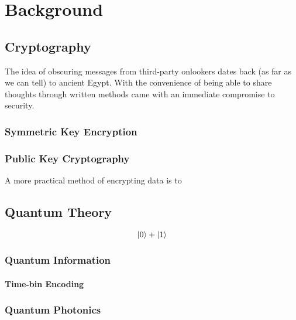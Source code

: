 %
%
\glsresetall
\graphicspath{{./chapters/chapter02/fig02/}}

\let\textcircled=\pgftextcircled
\chapter{Background}
\label{chap:background}

\section{Cryptography}
\label{sec1:crypto}

The idea of obscuring messages from third-party onlookers dates back (as far as we can tell) to ancient Egypt. With the convenience of being able to share thoughts through written methods came with an immediate compromise to security.

\subsection{Symmetric Key Encryption}

\subsection{Public Key Cryptography}

A more practical method of encrypting data is to 

\section{Quantum Theory}

\begin{equation}
	\ket{0} + \ket{1}
\end{equation}

\subsection{Quantum Information}

\subsubsection{Time-bin Encoding}

\subsection{Quantum Photonics}

